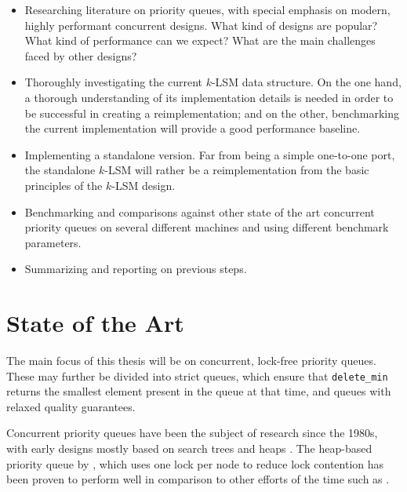 \documentclass[a4paper,11pt]{article}
\begin{document}
\begin{itemize}
    \item Researching literature on priority queues, with special emphasis on
        modern, highly performant concurrent designs. What kind of designs
        are popular? What kind of performance can we expect? What are the
        main challenges faced by other designs?
    \item Thoroughly investigating the current $k$-LSM data structure. On
        the one hand, a thorough understanding of its implementation
        details is needed in order to be successful in creating a reimplementation; and
        on the other, benchmarking the current implementation will provide a
        good performance baseline.
    \item Implementing a standalone version. Far from being a simple one-to-one
        port, the standalone $k$-LSM will rather be a reimplementation from
        the basic principles of the $k$-LSM design.
    \item Benchmarking and comparisons against other state of the art concurrent
        priority queues on several different machines and using different benchmark parameters.
    \item Summarizing and reporting on previous steps.
\end{itemize}

\section{State of the Art}

The main focus of this thesis will be on concurrent, lock-free priority queues.
These may further be divided into strict queues, which ensure that \lstinline|delete_min|
returns the smallest element present in the queue at that time,
and queues with relaxed quality guarantees.


Concurrent priority queues have been the subject of research since the 1980s, with
early designs mostly based on search trees \cite{boyar1994chromatic,johnson1991highly} and
heaps \cite{ayani1990lr,biswas1987simultaneous,das1996distributed,deo1992parallel,huang1991evaluation,
luchetti1993some,mans1998portable,olariu1991optimal,prasad1995parallel}. The heap-based
priority queue by \citeauthor{hunt1996efficient} \cite{hunt1996efficient}, which uses one lock
per node to reduce lock contention has been proven to
perform well \cite{shavit2000skiplist} in comparison to other efforts of the time such as
\cite{ayani1990lr,nageshwara1988concurrent,yan1998lock}.
\end{document}
